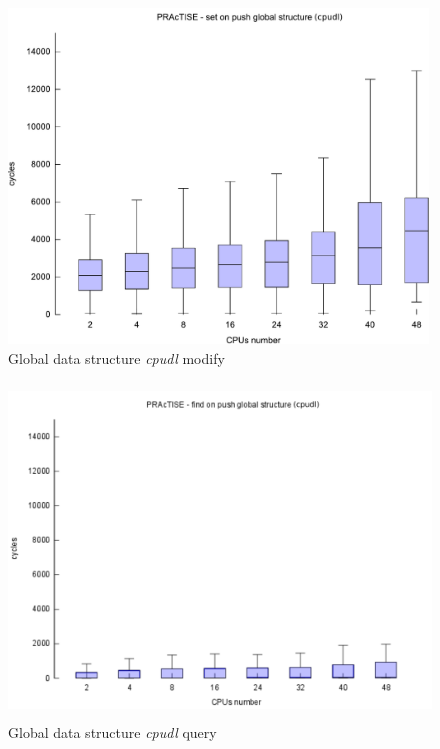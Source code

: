 \begin{figure}[htbp]
	\centering
	\includegraphics[height=3.5in, keepaspectratio]{images/PRACTISE_set_cpudl.pdf}
	\caption{Global data structure \emph{cpudl} modify}
	\label{fig:practise-set-edf}
\end{figure}

\begin{figure}[htbp]
	\centering
	\includegraphics[height=3.5in, keepaspectratio]{images/PRACTISE_find_cpudl.pdf}
	\caption{Global data structure \emph{cpudl} query}
	\label{fig:practise-find-edf}
\end{figure}


